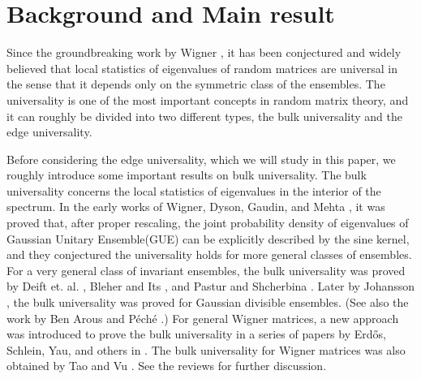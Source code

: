 \section{Background and Main result}

Since the groundbreaking work by Wigner \cite{W}, it has been conjectured and widely believed that local statistics of eigenvalues of random matrices are universal in the sense that it depends only on the symmetric class of the ensembles. The universality is one of the most important concepts in random matrix theory, and it can roughly be divided into two different types, the bulk universality and the edge universality. 

Before considering the edge universality, which we will study in this paper, we roughly introduce some important results on bulk universality. The bulk universality concerns the local statistics of eigenvalues in the interior of the spectrum. In the early works of Wigner, Dyson, Gaudin, and Mehta \cite{M, MG, D1, D2}, it was proved that, after proper rescaling, the joint probability density of eigenvalues of Gaussian Unitary Ensemble(GUE) can be explicitly described by the sine kernel, and they conjectured the universality holds for more general classes of ensembles. For a very general class of invariant ensembles, the bulk universality was proved by Deift et. al. \cite{DKMVZ1, DKMVZ2}, Bleher and Its \cite{BI}, and Pastur and Shcherbina \cite{PS}. Later by Johansson \cite{J2}, the bulk universality was proved for Gaussian divisible ensembles. (See also the work by Ben Arous and P\'ech\'e \cite{BP}.) For general Wigner matrices, a new approach was introduced to prove the bulk universality in a series of papers by   Erd\H{o}s, Schlein, Yau, and others in \cite{ESY1, ESY2, ESY3, ESY4, ESYY, EYY1, EYY2, EYY, EKYY1, EKYY2}. The bulk universality for Wigner matrices was also obtained by Tao and Vu \cite{TV1}. See the reviews \cite{EY, EY2} for further discussion.

